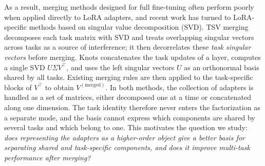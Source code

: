 \documentclass[10pt]{article} %
\begin{document}
    As a result, merging methods designed for full fine-tuning often perform poorly when applied directly to LoRA adapters, and recent work has turned to LoRA-specific methods based on singular value decomposition (SVD). TSV merging \citep{gargiulo2025task} decomposes each task matrix with SVD and treats overlapping singular vectors across tasks as a source of interference; it then decorrelates these \textit{task singular vectors} before merging. Knots \citep{stoica2025model} concatenates the task updates of a layer, computes a single SVD $U\Sigma V^{\top}$, and uses the left singular vectors $U$ as an orthonormal basis shared by all tasks. Existing merging rules are then applied to the task-specific blocks of $V^{\top}$ to obtain $V^{(\text{merged})}$. In both methods, the collection of adapters is handled as a set of matrices, either decomposed one at a time or concatenated along one dimension. The task identity therefore never enters the factorization as a separate mode, and the basis cannot express which components are shared by several tasks and which belong to one. This motivates the question we study: \textit{does representing the adapters as a higher-order object give a better basis for separating shared and task-specific components, and does it improve multi-task performance after merging?}
    
\end{document}
